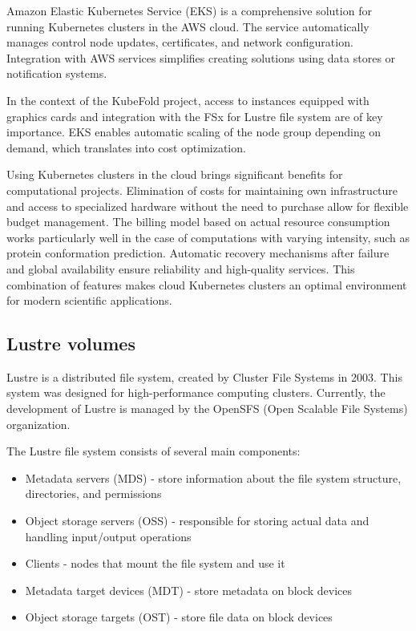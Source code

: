 Amazon Elastic Kubernetes Service (EKS) is a comprehensive solution for running Kubernetes clusters in the AWS cloud.
The service automatically manages control node updates, certificates, and network configuration.
Integration with AWS services simplifies creating solutions using data stores or notification systems.

In the context of the KubeFold project, access to instances equipped with graphics cards and integration with the FSx for Lustre file system are of key importance.
EKS enables automatic scaling of the node group depending on demand, which translates into cost optimization.

Using Kubernetes clusters in the cloud brings significant benefits for computational projects.
Elimination of costs for maintaining own infrastructure and access to specialized hardware without the need to purchase allow for flexible budget management.
The billing model based on actual resource consumption works particularly well in the case of computations with varying intensity, such as protein conformation prediction.
Automatic recovery mechanisms after failure and global availability ensure reliability and high-quality services.
This combination of features makes cloud Kubernetes clusters an optimal environment for modern scientific applications.

\subsection{Lustre volumes}

Lustre is a distributed file system, created by Cluster File Systems in 2003.
This system was designed for high-performance computing clusters.
Currently, the development of Lustre is managed by the OpenSFS (Open Scalable File Systems) organization.

The Lustre file system consists of several main components:
\begin{itemize}
    \item Metadata servers (MDS) - store information about the file system structure, directories, and permissions
    \item Object storage servers (OSS) - responsible for storing actual data and handling input/output operations
    \item Clients - nodes that mount the file system and use it
    \item Metadata target devices (MDT) - store metadata on block devices
    \item Object storage targets (OST) - store file data on block devices
\end{itemize}

